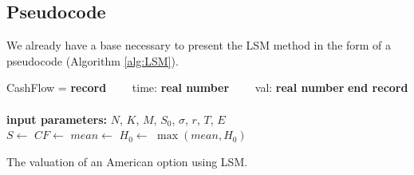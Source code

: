 \documentclass[a4paper,11pt, twoside]{book}
\theoremstyle{definition}
\theoremstyle{remark}
\begin{document}
\subsection{Pseudocode}
We already have a base necessary to present the LSM method in the form of a pseudocode (Algorithm \ref{alg:LSM}).

\begin{algorithm}
 \begin{algorithmic}[1]
  \State CashFlow = \textbf{record}
    \State\ \ \ \ time: \textbf{real number}
    \State\ \ \ \ val: \textbf{real number}
  \State \textbf{end record} \\
  \\
  \textbf{input parameters:} $N$, $K$, $M$, $S_0$, $\sigma$, $r$, $T$, $E$
  \\
    \State $S \gets $ 
    \State $CF \gets$ 
    \State $mean \gets$ 
    \State $H_0 \gets$ 
    \State \Return $\max(mean, H_0)$
  \EndFunction
 \end{algorithmic}
 \caption{The valuation of an American option using LSM.}
 \label{alg:LSM}
\end{algorithm}
  
\end{document}
